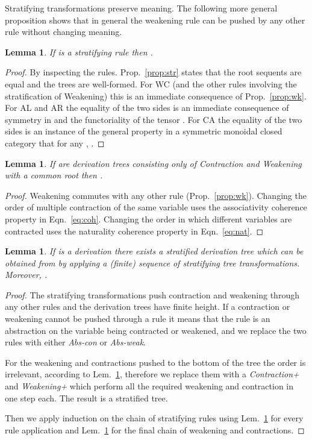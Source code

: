 \documentclass{article}
\newtheorem{lemma}[theorem]{Lemma}
\begin{document}
Stratifying transformations preserve meaning. The following more general proposition shows that in general the weakening rule can be pushed by any other rule without changing meaning.
\begin{lemma} \label{lem:streq}
If  is a stratifying rule then .
\end{lemma}
\begin{proof}
By inspecting the rules. Prop.~\ref{prop:str} states that the root
sequents are equal and the trees are well-formed. For WC (and the other rules involving the
stratification of Weakening) this is an immediate consequence of
Prop.~\ref{prop:wk}. For AL and AR the equality of the two sides is an
immediate consequence of symmetry in  and the
functoriality of the tensor . For CA the equality of the two sides is an instance of
the general property in a symmetric monoidal closed category that  for 
any , . 
\end{proof}
\begin{lemma}\label{lem:twk}
If  are   derivation trees consisting only of \emph{Contraction} and \emph{Weakening} with
a common root  then
. 
\end{lemma}
\begin{proof}
Weakening commutes with any other rule (Prop.~\ref{prop:wk}).
Changing the order of multiple contraction of the same variable
  uses the associativity coherence property in Eqn.~\ref{eq:coh}.
Changing the order in which different variables are contracted
  uses the naturality coherence property in Eqn.~\ref{eq:nat}.
\end{proof}
\begin{lemma}\label{lem:streq2}
If  is a  derivation there exists a stratified derivation
tree  which can be obtained from  by applying a
(finite) sequence of stratifying tree transformations. Moreover, .
\end{lemma}
\begin{proof}
The stratifying transformations push contraction and weakening through
any other rules and the derivation trees have finite height. If a contraction or weakening
cannot be pushed through a rule it means that the rule is an abstraction on the 
variable being contracted or weakened, and we replace the two rules with 
either \emph{Abs-con} or \emph{Abs-weak}. 

For the weakening and contractions pushed to the bottom of the tree the order
is irrelevant, according to Lem.~\ref{lem:twk}, therefore we replace them with
a \emph{Contraction+} and \emph{Weakening+} which perform all the required weakening
and contraction in one step each.
The result is a stratified  tree.

Then we
apply induction on the chain of stratifying rules using
Lem.~\ref{lem:streq} for every rule application and 
Lem.~\ref{lem:twk} for the final chain of weakening
and contractions.
\end{proof}
\end{document}
